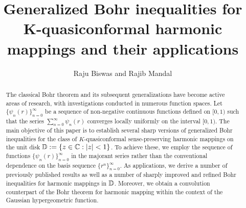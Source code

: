\documentclass[11pt,reqno]{amsart}
\newtheorem{open problem}{Open problem}[section]
\newcommand{\D}{{\Bbb{D}}}
\numberwithin{equation}{section}
\begin{document}
\title[generalized Bohr inequalities] {Generalized Bohr inequalities for K-quasiconformal harmonic mappings and their applications}
\author[R. Biswas and R. Mandal]{Raju Biswas and Rajib Mandal}
\date{}
\address{Raju Biswas, Department of Mathematics, Raiganj University, Raiganj, West Bengal-733134, India.}
\address{Rajib Mandal, Department of Mathematics, Raiganj University, Raiganj, West Bengal-733134, India.}

\maketitle
\let\thefootnote\relax
{}
\begin{abstract} The classical Bohr theorem and its subsequent generalizations have become active areas of research, with investigations conducted in numerous function spaces. 
Let $\{\psi_n(r)\}_{n=0}^\infty$ be a sequence of non-negative continuous functions defined on $[0,1)$ such that the series $\sum_{n=0}^\infty \psi_n(r)$ 
converges locally uniformly on the interval $[0, 1)$. The main objective of this paper is to establish several sharp versions of generalized Bohr inequalities for the class of $K$-quasiconformal sense-preserving harmonic mappings on the unit disk $\D := \{z \in \mathbb{C} : |z| < 1\}$. To achieve these, we employ the sequence of functions $\{\psi_n(r)\}_{n=0}^\infty$ in the majorant series 
rather than the conventional dependence on the basis sequence $\{r^n\}_{n=0}^\infty$.
As applications, we derive a number of previously published results as well as a number of sharply improved and refined Bohr inequalities for harmonic mappings in $\D$. Moreover, 
we obtain a convolution counterpart of the Bohr theorem for harmonic mapping within the context of the Gaussian hypergeometric function.
\end{abstract}
\end{document}
